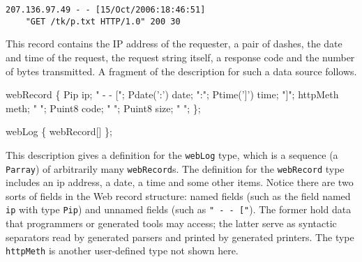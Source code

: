 \documentclass{article}
\begin{document}
{\small \begin{verbatim}
207.136.97.49 - - [15/Oct/2006:18:46:51] 
	"GET /tk/p.txt HTTP/1.0" 200 30
\end{verbatim}
}
This record contains the IP address of the requester, a pair of
dashes, the date and time of the request, the request string itself, 
a response code and the number of bytes transmitted.  A fragment of the
\pads{} description for such a data source follows.  
\begin{code}
 webRecord \{
  Pip        ip;   " - - [";          
  Pdate(':') date; ":";
  Ptime(']') time; "]";     
  httpMeth   meth; " ";
  Puint8     code; " "; 
  Puint8     size; " "; \};

 webLog \{ webRecord[] \};
\end{code}
This description gives a definition
for the {\tt webLog} type, which is a sequence (a {\tt Parray})
of arbitrarily many {\tt webRecord}s.  The definition
for the {\tt webRecord} type includes an ip address, a date,
a time and some other items.  Notice there are two sorts of fields
in the Web record structure: named fields (such as the field named
{\tt ip} with type {\tt Pip}) and unnamed fields (such as 
{\tt  " - - ["}).  The former hold data that programmers or generated
tools may access; the latter serve as syntactic separators read by
generated parsers and printed by generated printers.  The type
{\tt httpMeth} is another user-defined type not shown here.


\end{document}
